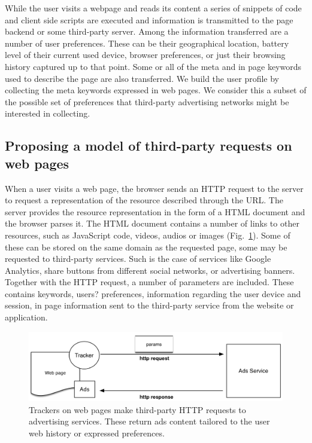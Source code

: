 While the user visits a webpage and reads its content a series of snippets of code and client side scripts are executed and information is transmitted to the page backend or some third-party server. Among the information transferred are a number of user preferences. These can be their geographical location, battery level of their current used device, browser preferences, or just their browsing history captured up to that point. Some or all of the meta and in page keywords used to describe the page are also transferred. We build the user profile by collecting the meta keywords expressed in web pages. We consider this a subset of the possible set of preferences that third-party advertising networks might be interested in collecting.

\subsection{Proposing a model of third-party requests on web pages}

When a user visits a web page, the browser sends an HTTP request to the server to request a representation of the resource described through the URL. The server provides the resource representation in the form of a HTML document and the browser parses it. The HTML document contains a number of links to other resources, such as JavaScript code, videos, audios or images (Fig.~\ref{fig:third-party}). Some of these can be stored on the same domain as the requested page, some may be requested to third-party services. Such is the case of services like Google Analytics, share buttons from different social networks, or advertising banners. Together with the HTTP request, a number of parameters are included. These contains keywords, users? preferences, information regarding the user device and session, in page information sent to the third-party service from the website or application.

\begin{figure}
\includegraphics[width=\textwidth]{figures/tracker-request.png}
\caption[Structure of a tracker request]{Trackers on web pages make third-party HTTP requests to advertising services. These return ads content tailored to the user web history or expressed preferences.
\label{fig:third-party}}
\end{figure}


